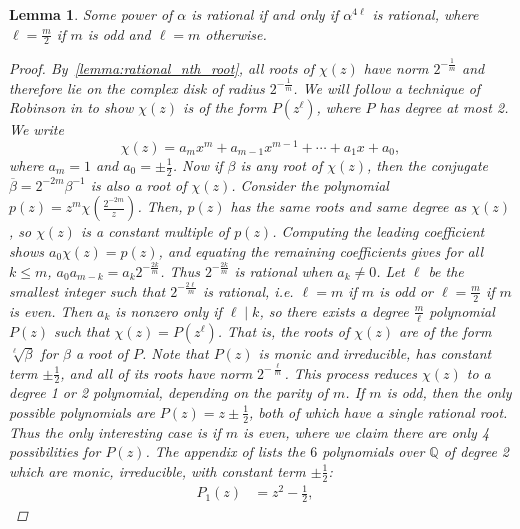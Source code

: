 \documentclass[12pt, letterpaper]{article}
\newcommand{\paren}[1]{\left(#1\right)}
\newcommand{\pfrac}[2]{\paren{\frac{#1}{#2}}}
\newcommand{\Q}{\mathbb Q}
\newtheorem{lemma}[thm]{Lemma}
\begin{document}
\begin{lemma}\label{lemma:charpoly_restriction}
    Some power of $\alpha$ is rational if and only if $\alpha^{4\ell}$ is
    rational, where $\ell = \frac{m}{2}$ if $m$ is odd and $\ell = m$
    otherwise.
    \begin{proof}
        By~\cref{lemma:rational_nth_root}, all roots of $\chi(z)$ have norm
        $2^{-\frac{1}{m}}$ and therefore lie on the complex disk of radius
        $2^{-\frac{1}{m}}$. We will follow a technique of Robinson in
        \cite{Robinson1969} to show $\chi(z)$ is of the form $P(z^\ell)$,
        where $P$ has degree at most 2. We write
        \[
            \chi(z) = a_m x^m + a_{m-1}x^{m-1} + \cdots + a_1 x + a_0,
        \]
        where $a_m = 1$ and $a_0 = \pm \frac{1}{2}$. Now if $\beta$ is any root
        of $\chi(z)$, then the conjugate $\overline{\beta} = 2^{-2m}
        \beta^{-1}$ is also a root of $\chi(z)$.  Consider the polynomial $p(z)
        = z^m \chi\pfrac{2^{-2m}}{z}$. Then, $p(z)$ has the same roots and same
        degree as $\chi(z)$, so $\chi(z)$ is a constant multiple of $p(z)$.
        Computing the leading coefficient shows $a_0 \chi(z) = p(z)$, and
        equating the remaining coefficients gives for all $k \le m$,
        $a_0 a_{m-k} = a_k 2^{-\frac{2k}{m}}$.  Thus $2^{-\frac{2k}{m}}$ is
        rational when $a_k \ne 0$. Let $\ell$ be the smallest integer such that
        $2^{-\frac{2\ell}{m}}$ is rational, i.e. $\ell = m$ if $m$ is odd or
        $\ell = \frac{m}{2}$ if $m$ is even.  Then $a_k$ is nonzero only if
        $\ell \mid k$, so there exists a degree $\frac{m}{\ell}$ polynomial
        $P(z)$ such that $\chi(z) = P\paren{z^{\ell}}$. That is, the roots of
        $\chi(z)$ are of the form $\sqrt[\ell]{\beta}$ for $\beta$ a root of
        $P$.  Note that $P(z)$ is monic and irreducible, has constant term $\pm
        \frac{1}{2}$, and all of its roots have norm $2^{-\frac{\ell}{m}}$.
        This process reduces $\chi(z)$ to a degree 1 or 2 polynomial, depending
        on the parity of $m$. If $m$ is odd, then the only possible polynomials
        are $P(z) = z \pm \frac{1}{2}$, both of which have a single rational
        root.  Thus the only interesting case is if $m$ is even, where we claim
        there are only 4 possibilities for $P(z)$. The appendix of
        \cite{Okano-Thesis} lists the $6$ polynomials over $\Q$ of degree 2
        which are monic, irreducible, with constant term $\pm \frac{1}{2}$:
        \begin{align*}
            P_1(z) &= z^2 - \frac{1}{2}, &

\end{align*}
\end{proof}
\end{lemma}
\end{document}
